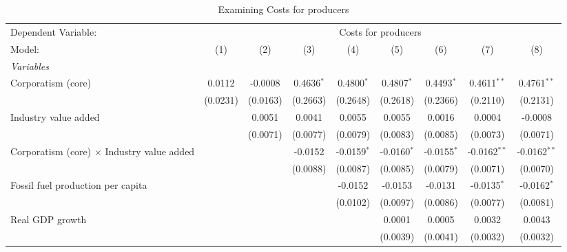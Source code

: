 
\begin{table}[htbp]
   \caption{Examining Costs for producers}
   \centering
   \begin{tabular}{lcccccccc}
      \tabularnewline \midrule \midrule
      Dependent Variable: & \multicolumn{8}{c}{Costs for producers}\\
      Model:                                            & (1)      & (2)      & (3)          & (4)           & (5)           & (6)           & (7)            & (8)\\  
      \midrule
      \emph{Variables}\\
      Corporatism (core)                                & 0.0112   & -0.0008  & 0.4636$^{*}$ & 0.4800$^{*}$  & 0.4807$^{*}$  & 0.4493$^{*}$  & 0.4611$^{**}$  & 0.4761$^{**}$\\   
                                                        & (0.0231) & (0.0163) & (0.2663)     & (0.2648)      & (0.2618)      & (0.2366)      & (0.2110)       & (0.2131)\\   
      Industry value added                              &          & 0.0051   & 0.0041       & 0.0055        & 0.0055        & 0.0016        & 0.0004         & -0.0008\\   
                                                        &          & (0.0071) & (0.0077)     & (0.0079)      & (0.0083)      & (0.0085)      & (0.0073)       & (0.0071)\\   
      Corporatism (core) $\times$ Industry value added  &          &          & -0.0152      & -0.0159$^{*}$ & -0.0160$^{*}$ & -0.0155$^{*}$ & -0.0162$^{**}$ & -0.0162$^{**}$\\   
                                                        &          &          & (0.0088)     & (0.0087)      & (0.0085)      & (0.0079)      & (0.0071)       & (0.0070)\\   
      Fossil fuel production per capita                 &          &          &              & -0.0152       & -0.0153       & -0.0131       & -0.0135$^{*}$  & -0.0162$^{*}$\\   
                                                        &          &          &              & (0.0102)      & (0.0097)      & (0.0086)      & (0.0077)       & (0.0081)\\   
      Real GDP growth                                   &          &          &              &               & 0.0001        & 0.0005        & 0.0032         & 0.0043\\   
                                                        &          &          &              &               & (0.0039)      & (0.0041)      & (0.0032)       & (0.0032)\\   

\end{tabular}
\end{table}

